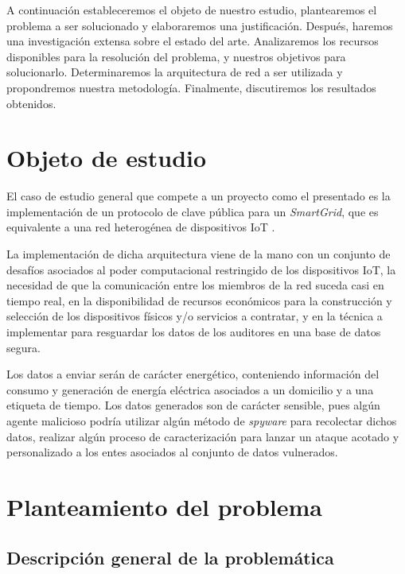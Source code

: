 \documentclass{article}
\begin{document}
        A continuación estableceremos el objeto de nuestro estudio, plantearemos el problema a ser solucionado y elaboraremos una justificación. Después, haremos una investigación extensa sobre el estado del arte. Analizaremos los recursos disponibles para la resolución del problema, y nuestros objetivos para solucionarlo. Determinaremos la arquitectura de red a ser utilizada y propondremos nuestra metodología. Finalmente, discutiremos los resultados obtenidos.

    \section{Objeto de estudio}

        El caso de estudio general que compete a un proyecto como el presentado es la implementación de un protocolo de clave pública para un \textit{SmartGrid}, que es equivalente a una red heterogénea de dispositivos IoT \cite{smart_grid_def}.

        La implementación de dicha arquitectura viene de la mano con un conjunto de desafíos asociados al poder computacional restringido de los dispositivos IoT, la necesidad de que la comunicación entre los miembros de la red suceda casi en tiempo real, en la disponibilidad de recursos económicos para la construcción y selección de los dispositivos físicos y/o servicios a contratar, y en la técnica a implementar para resguardar los datos de los auditores en una base de datos segura.

        Los datos a enviar serán de carácter energético, conteniendo información del consumo y generación de energía eléctrica asociados a un domicilio y a una etiqueta de tiempo. Los datos generados son de carácter sensible, pues algún agente malicioso podría utilizar algún método de \textit{spyware} para recolectar dichos datos, realizar algún proceso de caracterización para lanzar un ataque acotado y personalizado a los entes asociados al conjunto de datos vulnerados.

    \section{Planteamiento del problema}

        \subsection{Descripción general de la problemática}
\end{document}
